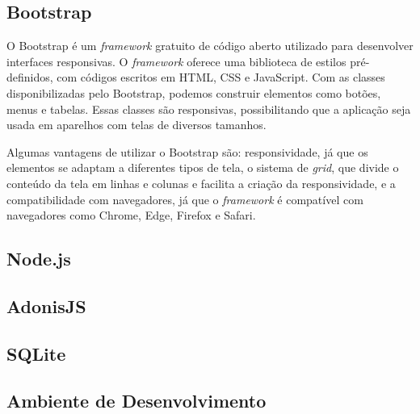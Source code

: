 
\subsection{Bootstrap}

O Bootstrap é um \textit{framework} gratuito de código aberto utilizado para desenvolver interfaces responsivas. O \textit{framework} oferece uma biblioteca de estilos pré-definidos, com códigos escritos em HTML, CSS e JavaScript. Com as classes disponibilizadas pelo Bootstrap, podemos construir elementos como botões, menus e tabelas. Essas classes são responsivas, possibilitando que a aplicação seja usada em aparelhos com telas de diversos tamanhos.

Algumas vantagens de utilizar o Bootstrap são: responsividade, já que os elementos se adaptam a diferentes tipos de tela, o sistema de \textit{grid}, que divide o conteúdo da tela em linhas e colunas e facilita a criação da responsividade, e a compatibilidade com navegadores, já que o \textit{framework} é compatível com navegadores como Chrome, Edge, Firefox e Safari.

\subsection{Node.js}

\subsection{AdonisJS}

\subsection{SQLite}

\subsection{Ambiente de Desenvolvimento}